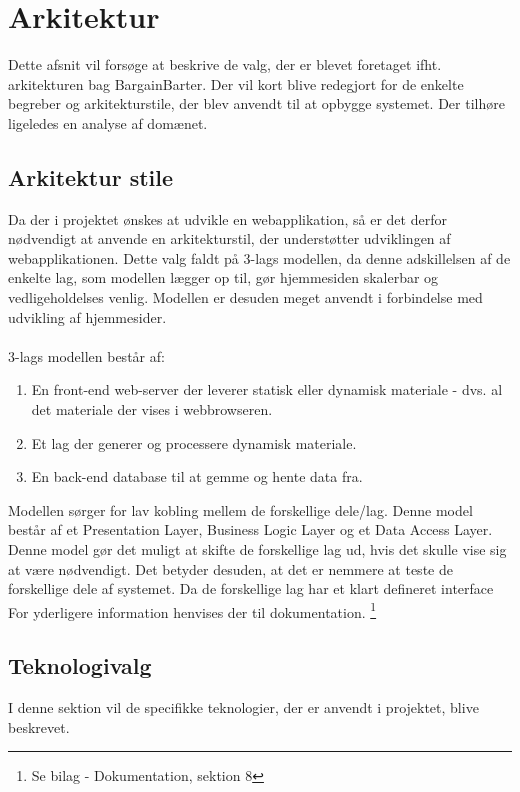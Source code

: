 \chapter{Arkitektur}
Dette afsnit vil forsøge at beskrive de valg, der er blevet foretaget ifht. arkitekturen bag BargainBarter. Der vil kort blive redegjort for de enkelte begreber og arkitekturstile, der blev anvendt til at opbygge systemet. Der tilhøre ligeledes en analyse af domænet.

\section{Arkitektur stile}
Da der i projektet ønskes at udvikle en webapplikation, så er det derfor nødvendigt at anvende en arkitekturstil, der understøtter udviklingen af webapplikationen.
Dette valg faldt på 3-lags modellen, da denne adskillelsen af de enkelte lag, som modellen lægger op til, gør hjemmesiden skalerbar og vedligeholdelses venlig. Modellen er desuden meget anvendt i forbindelse med udvikling af hjemmesider.\\ \\ 3-lags modellen består af:
\begin{enumerate}
	\item En front-end web-server der leverer statisk eller dynamisk materiale - dvs. al det materiale der vises i webbrowseren.
	\item Et lag der generer og processere dynamisk materiale.
	\item En back-end database til at gemme og hente data fra.
\end{enumerate}

\noindent Modellen sørger for lav kobling mellem de forskellige dele/lag. Denne model består af et Presentation Layer, Business Logic Layer og et Data Access Layer. Denne model gør det muligt at skifte de forskellige lag ud, hvis det skulle vise sig at være nødvendigt. Det betyder desuden, at det er nemmere at teste de forskellige dele af systemet. Da de forskellige lag har et klart defineret interface \\
For yderligere information henvises der til dokumentation. \footnote{Se bilag - Dokumentation, sektion 8}

\section{Teknologivalg}
I denne sektion vil de specifikke teknologier, der er anvendt i projektet, blive beskrevet.

